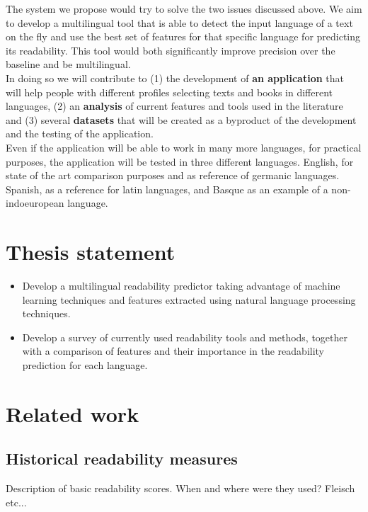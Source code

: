 \documentclass[12pt]{article}
\begin{document}
The system we propose would try to solve the two issues discussed above. We aim to develop a multilingual tool that is able to detect the input language of a text on the fly and use the best set of features for that specific language for predicting its readability. This tool would both significantly improve precision over the baseline and be multilingual.\\

In doing so we will contribute to (1) the development of \textbf{an application} that will help people with different profiles selecting texts and books in different languages, (2) an \textbf{analysis} of current features and tools used in the literature and (3) several \textbf{datasets} that will be created as a byproduct of the development and the testing of the application.\\

Even if the application will be able to work in many more languages, for practical purposes, the application will be tested in three different languages. English, for state of the art comparison purposes and as reference of germanic languages. Spanish, as a reference for latin languages, and Basque as an example of a non-indoeuropean language.



\section{Thesis statement}
\begin{itemize}
\item Develop a multilingual readability predictor taking advantage of machine learning techniques and features extracted using natural language processing techniques.
\item Develop a survey of currently used readability tools and methods, together with a comparison of features and their importance in the readability prediction for each language.

\end{itemize}

\section{Related work}
\subsection{Historical readability measures}
Description of basic readability scores. When and where were they used? Fleisch etc...
\end{document}
